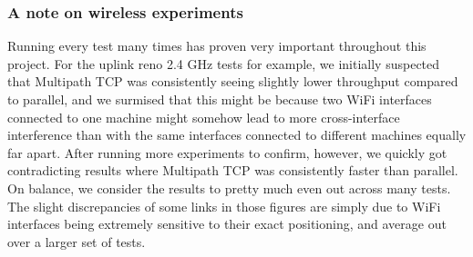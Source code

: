\subsubsection{A note on wireless experiments}
Running every test many times has proven very important throughout this project.
For the uplink reno 2.4 GHz tests for example, we initially suspected that
Multipath TCP was consistently seeing slightly lower throughput compared to
parallel, and we surmised that this might be because two WiFi interfaces
connected to one machine might somehow lead to more cross-interface interference
than with the same interfaces connected to different machines equally far apart.
After running more experiments to confirm, however, we quickly got contradicting
results where Multipath TCP was consistently faster than parallel. On balance,
we consider the results to pretty much even out across many tests. The slight
discrepancies of some links in those figures are simply due to WiFi interfaces
being extremely sensitive to their exact positioning, and average out over a
larger set of tests.
